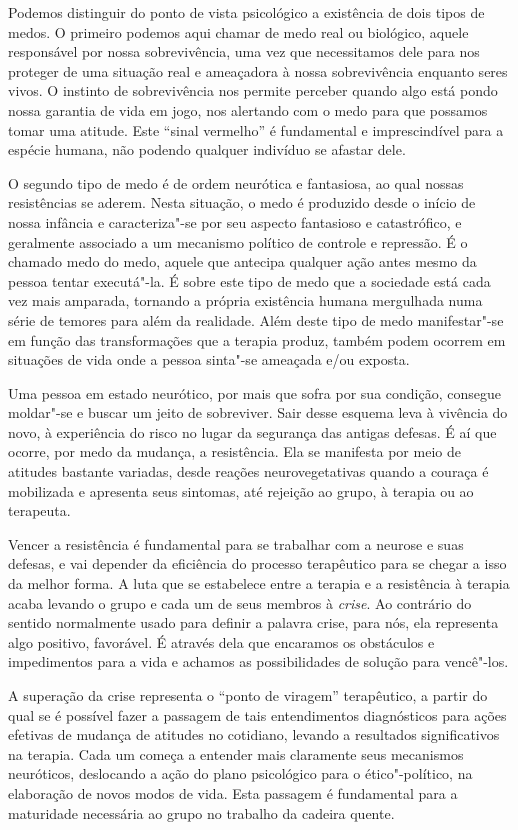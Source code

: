 Podemos distinguir do ponto de vista psicológico a existência de dois
tipos de medos. O primeiro podemos aqui chamar de medo real ou
biológico, aquele responsável por nossa sobrevivência, uma vez que
necessitamos dele para nos proteger de uma situação real e ameaçadora à
nossa sobrevivência enquanto seres vivos. O instinto de sobrevivência
nos permite perceber quando algo está pondo nossa garantia de vida em
jogo, nos alertando com o medo para que possamos tomar uma atitude. Este
``sinal vermelho'' é fundamental e imprescindível para a espécie humana,
não podendo qualquer indivíduo se afastar dele.

O segundo tipo de medo é de ordem neurótica e fantasiosa, ao qual nossas
resistências se aderem. Nesta situação, o medo é produzido desde o
início de nossa infância e caracteriza"-se por seu aspecto fantasioso e
catastrófico, e geralmente associado a um mecanismo político de controle
e repressão. É o chamado medo do medo, aquele que antecipa qualquer ação
antes mesmo da pessoa tentar executá"-la. É sobre este tipo de medo que a
sociedade está cada vez mais amparada, tornando a própria existência
humana mergulhada numa série de temores para além da realidade. Além
deste tipo de medo manifestar"-se em função das transformações que a
terapia produz, também podem ocorrem em situações de vida onde a pessoa
sinta"-se ameaçada e/ou exposta.

Uma pessoa em estado neurótico, por mais que sofra por sua condição,
consegue moldar"-se e buscar um jeito de sobreviver. Sair desse esquema
leva à vivência do novo, à experiência do risco no lugar da segurança
das antigas defesas. É aí que ocorre, por medo da mudança, a
resistência. Ela se manifesta por meio de atitudes bastante variadas,
desde reações neurovegetativas quando a couraça é mobilizada e apresenta
seus sintomas, até rejeição ao grupo, à terapia ou ao terapeuta.

Vencer a resistência é fundamental para se trabalhar com a neurose e
suas defesas, e vai depender da eficiência do processo terapêutico para
se chegar a isso da melhor forma. A luta que se estabelece entre a terapia
e a resistência à terapia acaba levando o grupo e cada um de seus
membros à \emph{crise}. Ao contrário do sentido normalmente usado para
definir a palavra crise, para nós, ela representa algo positivo,
favorável. É através dela que encaramos os obstáculos e impedimentos
para a vida e achamos as possibilidades de solução para vencê"-los.

A superação da crise representa o ``ponto de viragem'' terapêutico, a
partir do qual se é possível fazer a passagem de tais entendimentos
diagnósticos para ações efetivas de mudança de atitudes no cotidiano,
levando a resultados significativos na terapia. Cada um começa a
entender mais claramente seus mecanismos neuróticos, deslocando a ação
do plano psicológico para o ético"-político, na elaboração de novos modos
de vida. Esta passagem é fundamental para a maturidade necessária ao
grupo no trabalho da cadeira quente.

